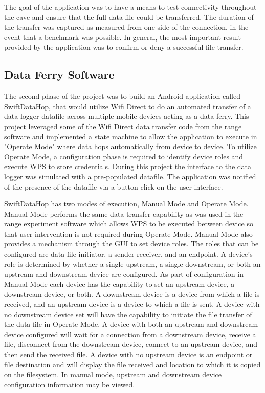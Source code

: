 \documentclass[10pt,twocolumn]{article}
\begin{document}
The goal of the application was to have a means to test connectivity throughout the cave and ensure that the full data file could be transferred.
The duration of the transfer was captured as measured from one side of the connection, in the event that a benchmark was possible.
In general, the most important result provided by the application was to confirm or deny a successful file transfer.

\subsection{Data Ferry Software}
The second phase of the project was to build an Android application called SwiftDataHop, that would utilize Wifi Direct to do an automated transfer of a data logger datafile across multiple mobile devices acting as a data ferry. 
This project leveraged some of the Wifi Direct data transfer code from the range software and implemented a state machine to allow the application to execute in "Operate Mode" where data hops automatically from device to device. 
To utilize Operate Mode, a configuration phase is required to identify device roles and execute WPS to store credentials.
During this project the interface to the data logger was simulated with a pre-populated datafile.
The application was notified of the presence of the datafile via a button click on the user interface.

SwiftDataHop has two modes of execution, Manual Mode and Operate Mode.
Manual Mode performs the same data transfer capability as was used in the range experiment software which allows WPS to be executed between device so that user intervention is not required during Operate Mode.
Manual Mode also provides a mechanism through the GUI to set device roles.
The roles that can be configured are data file initiator, a sender-receiver, and an endpoint.
A device's role is determined by whether a single upstream, a single downstream, or both an upstream and downstream device are configured.
As part of configuration in Manual Mode each device has the capability to set an upstream device, a downstream device, or both.  
A downstream device is a device from which a file is received, and an upstream device is a device to which a file is sent.
A device with no downstream device set will have the capability to initiate the file transfer of the data file in Operate Mode.
A device with both an upstream and downstream device configured will wait for a connection from a downstream device, receive a file, disconnect from the downstream device, connect to an upstream device, and then send the received file.
A device with no upstream device is an endpoint or file destination and will display the file received and location to which it is copied on the filesystem.
In manual mode, upstream and downstream device configuration information may be viewed.
\end{document}
